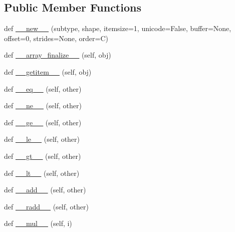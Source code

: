 \subsection*{Public Member Functions}
\begin{DoxyCompactItemize}
\item 
def \hyperlink{classnumpy_1_1core_1_1defchararray_1_1chararray_a411027ab27abddba559c501e4e3d4e0e}{\+\_\+\+\_\+new\+\_\+\+\_\+} (subtype, shape, itemsize=1, unicode=False, buffer=None, offset=0, strides=None, order=\textquotesingle{}C\textquotesingle{})
\item 
def \hyperlink{classnumpy_1_1core_1_1defchararray_1_1chararray_a0f5b3f2716bd267b0bd00549c5204b39}{\+\_\+\+\_\+array\+\_\+finalize\+\_\+\+\_\+} (self, obj)
\item 
def \hyperlink{classnumpy_1_1core_1_1defchararray_1_1chararray_a309445306acd4043961e36dba0763e50}{\+\_\+\+\_\+getitem\+\_\+\+\_\+} (self, obj)
\item 
def \hyperlink{classnumpy_1_1core_1_1defchararray_1_1chararray_a6532e91f2789d5108f5eedadcf62b647}{\+\_\+\+\_\+eq\+\_\+\+\_\+} (self, other)
\item 
def \hyperlink{classnumpy_1_1core_1_1defchararray_1_1chararray_a7cc0667bd6af6a73c7ae5e654dce0c43}{\+\_\+\+\_\+ne\+\_\+\+\_\+} (self, other)
\item 
def \hyperlink{classnumpy_1_1core_1_1defchararray_1_1chararray_a867ee0a22d08a8236c9b83fbfe39a577}{\+\_\+\+\_\+ge\+\_\+\+\_\+} (self, other)
\item 
def \hyperlink{classnumpy_1_1core_1_1defchararray_1_1chararray_a5be4e30e5ce6d50c60eb3baa274cac5a}{\+\_\+\+\_\+le\+\_\+\+\_\+} (self, other)
\item 
def \hyperlink{classnumpy_1_1core_1_1defchararray_1_1chararray_ac429b689eeb1c0d02b406f69c66a26b7}{\+\_\+\+\_\+gt\+\_\+\+\_\+} (self, other)
\item 
def \hyperlink{classnumpy_1_1core_1_1defchararray_1_1chararray_ac821e9535e887e47c1b556114d704bc1}{\+\_\+\+\_\+lt\+\_\+\+\_\+} (self, other)
\item 
def \hyperlink{classnumpy_1_1core_1_1defchararray_1_1chararray_ac648ad17757631ef010d4683b24cf110}{\+\_\+\+\_\+add\+\_\+\+\_\+} (self, other)
\item 
def \hyperlink{classnumpy_1_1core_1_1defchararray_1_1chararray_a4d028a0c7fcdad5daf040a402d3c802f}{\+\_\+\+\_\+radd\+\_\+\+\_\+} (self, other)
\item 
def \hyperlink{classnumpy_1_1core_1_1defchararray_1_1chararray_a5691747385db112515f75f14c6bff56a}{\+\_\+\+\_\+mul\+\_\+\+\_\+} (self, i)

\end{DoxyCompactItemize}
